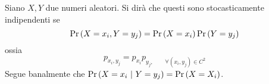 \documentclass{subfiles}
\begin{document}
Siano \(X, Y\) due numeri aleatori. Si dirà che questi sono stocasticamente indipendenti se
\[
    \Prob{X = x_{i}, Y = y_{j}} = \Prob{X = x_{i}} \Prob{Y = y_{j}}
\]
ossia
\[
    p_{x_{i}, y_{j}} = p_{x_{i}} p_{y_{j}, \qquad \forall (x_{i}, y_{j}) \in C^{2}}
\]
Segue banalmente che \(\Prob{X = x_{i}}[Y = y_{j}] = \Prob{X = X_{i}}\).
\end{document}
